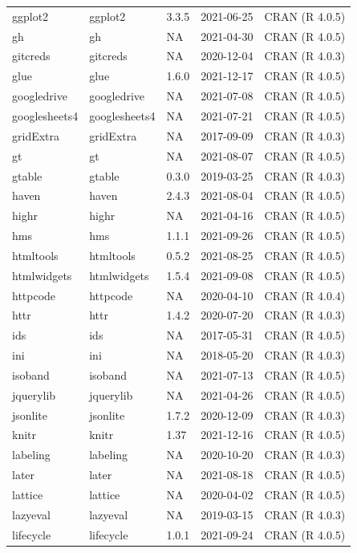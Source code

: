 \begin{tabular}{lllll}
ggplot2 & ggplot2 & 3.3.5 & 2021-06-25 & CRAN (R 4.0.5)\\
gh & gh & NA & 2021-04-30 & CRAN (R 4.0.5)\\
gitcreds & gitcreds & NA & 2020-12-04 & CRAN (R 4.0.3)\\
\addlinespace
glue & glue & 1.6.0 & 2021-12-17 & CRAN (R 4.0.5)\\
googledrive & googledrive & NA & 2021-07-08 & CRAN (R 4.0.5)\\
googlesheets4 & googlesheets4 & NA & 2021-07-21 & CRAN (R 4.0.5)\\
gridExtra & gridExtra & NA & 2017-09-09 & CRAN (R 4.0.3)\\
gt & gt & NA & 2021-08-07 & CRAN (R 4.0.5)\\
\addlinespace
gtable & gtable & 0.3.0 & 2019-03-25 & CRAN (R 4.0.3)\\
haven & haven & 2.4.3 & 2021-08-04 & CRAN (R 4.0.5)\\
highr & highr & NA & 2021-04-16 & CRAN (R 4.0.5)\\
hms & hms & 1.1.1 & 2021-09-26 & CRAN (R 4.0.5)\\
htmltools & htmltools & 0.5.2 & 2021-08-25 & CRAN (R 4.0.5)\\
\addlinespace
htmlwidgets & htmlwidgets & 1.5.4 & 2021-09-08 & CRAN (R 4.0.5)\\
httpcode & httpcode & NA & 2020-04-10 & CRAN (R 4.0.4)\\
httr & httr & 1.4.2 & 2020-07-20 & CRAN (R 4.0.3)\\
ids & ids & NA & 2017-05-31 & CRAN (R 4.0.5)\\
ini & ini & NA & 2018-05-20 & CRAN (R 4.0.3)\\
\addlinespace
isoband & isoband & NA & 2021-07-13 & CRAN (R 4.0.5)\\
jquerylib & jquerylib & NA & 2021-04-26 & CRAN (R 4.0.5)\\
jsonlite & jsonlite & 1.7.2 & 2020-12-09 & CRAN (R 4.0.3)\\
knitr & knitr & 1.37 & 2021-12-16 & CRAN (R 4.0.5)\\
labeling & labeling & NA & 2020-10-20 & CRAN (R 4.0.3)\\
\addlinespace
later & later & NA & 2021-08-18 & CRAN (R 4.0.5)\\
lattice & lattice & NA & 2020-04-02 & CRAN (R 4.0.5)\\
lazyeval & lazyeval & NA & 2019-03-15 & CRAN (R 4.0.3)\\
lifecycle & lifecycle & 1.0.1 & 2021-09-24 & CRAN (R 4.0.5)\\

\end{tabular}

